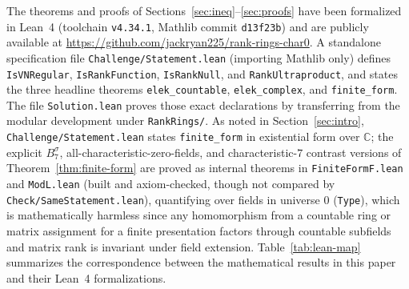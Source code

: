 \documentclass[11pt]{article}
\theoremstyle{definition}
\theoremstyle{remark}
\numberwithin{equation}{section}
\newcommand{\C}{\mathbb{C}}
\newcommand{\1}{\mathbf{1}}
\newcommand{\code}[1]{{\normalfont\small\texttt{#1}}}
\begin{document}
The theorems and proofs of Sections~\ref{sec:ineq}--\ref{sec:proofs} have been formalized in Lean~4 (toolchain \code{v4.34.1}, Mathlib commit \code{d13f23b}) and are publicly available at \url{https://github.com/jackryan225/rank-rings-char0}. A standalone specification file \code{Challenge/Statement.lean} (importing Mathlib only) defines \code{IsVNRegular}, \code{IsRankFunction}, \code{IsRankNull}, and \code{RankUltraproduct}, and states the three headline theorems \code{elek\_countable}, \code{elek\_complex}, and \code{finite\_form}. The file \code{Solution.lean} proves those exact declarations by transferring from the modular development under \code{RankRings/}. As noted in Section~\ref{sec:intro}, \code{Challenge/Statement.lean} states \code{finite\_form} in existential form over $\C$; the explicit $B_7^\sigma$, all-characteristic-zero-fields, and characteristic-$7$ contrast versions of Theorem~\ref{thm:finite-form} are proved as internal theorems in \code{FiniteFormF.lean} and \code{ModL.lean} (built and axiom-checked, though not compared by \code{Check/SameStatement.lean}), quantifying over fields in universe $0$ (\code{Type}), which is mathematically harmless since any homomorphism from a countable ring or matrix assignment for a finite presentation factors through countable subfields and matrix rank is invariant under field extension. Table~\ref{tab:lean-map} summarizes the correspondence between the mathematical results in this paper and their Lean~4 formalizations.
\end{document}
